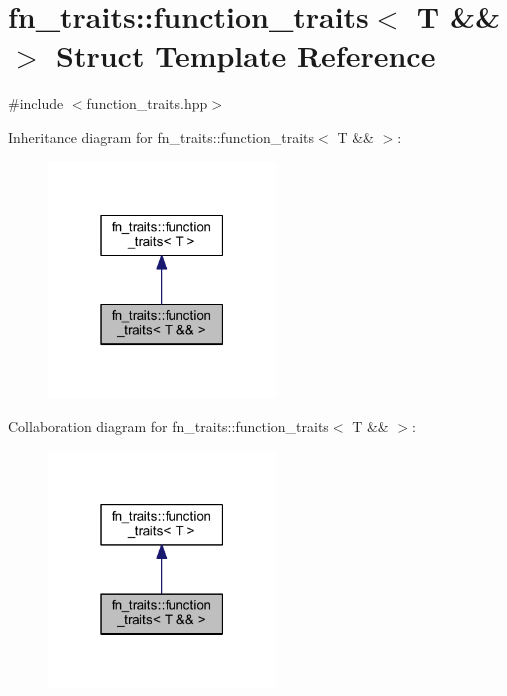 \hypertarget{structfn__traits_1_1function__traits_3_01_t_01_6_6_01_4}{}\section{fn\+\_\+traits\+:\+:function\+\_\+traits$<$ T \&\& $>$ Struct Template Reference}
\label{structfn__traits_1_1function__traits_3_01_t_01_6_6_01_4}


{\ttfamily \#include $<$function\+\_\+traits.\+hpp$>$}



Inheritance diagram for fn\+\_\+traits\+:\+:function\+\_\+traits$<$ T \&\& $>$\+:\nopagebreak
\begin{figure}[H]
\begin{center}
\leavevmode
\includegraphics[width=171pt]{db/dfd/structfn__traits_1_1function__traits_3_01_t_01_6_6_01_4__inherit__graph}
\end{center}
\end{figure}


Collaboration diagram for fn\+\_\+traits\+:\+:function\+\_\+traits$<$ T \&\& $>$\+:\nopagebreak
\begin{figure}[H]
\begin{center}
\leavevmode
\includegraphics[width=171pt]{d4/d35/structfn__traits_1_1function__traits_3_01_t_01_6_6_01_4__coll__graph}
\end{center}
\end{figure}


